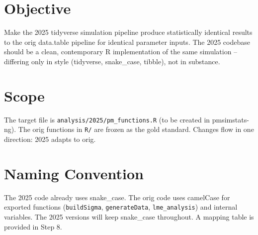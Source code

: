 \documentclass[11pt]{article}
\begin{document}
\maketitle
\thispagestyle{fancy}

\begin{center}
\end{center}

\bigskip
\tableofcontents

\section{Objective}

Make the 2025 tidyverse simulation pipeline produce statistically
identical results to the orig data.table pipeline for identical
parameter inputs. The 2025 codebase should be a clean, contemporary
R implementation of the same simulation -- differing only in style
(tidyverse, snake\_case, tibble), not in substance.

\section{Scope}

The target file is \texttt{analysis/2025/pm\_functions.R} (to be created
in pmsimstats-ng). The orig functions in \texttt{R/} are frozen as the
gold standard. Changes flow in one direction: 2025 adapts to orig.

\section{Naming Convention}

The 2025 code already uses snake\_case. The orig code uses camelCase
for exported functions (\texttt{buildSigma}, \texttt{generateData}, \texttt{lme\_analysis})
and internal variables. The 2025 versions will keep snake\_case
throughout. A mapping table is provided in Step 8.
\end{document}
